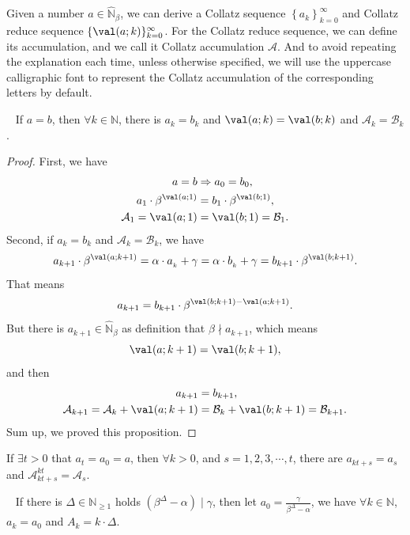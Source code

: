 Given a number $a \in \widehat{\mathbb{N}}_{{\beta}}$, we can derive a Collatz sequence $\left\{a_{k}\right\}_{k = 0}^{\infty}$ and Collatz reduce sequence $\{\val(a;k)\}_{k=0}^{\infty}$. For the Collatz reduce sequence, we can define its accumulation, and we call it Collatz accumulation $\mathcal{A}$.
And to avoid repeating the explanation each time, unless otherwise specified, we will use the uppercase calligraphic font to represent the Collatz accumulation of the corresponding letters by default.
\begin{proposition}[Uniqueness]~\label{proposition:uniqueness}
If $a = b$, then $\forall k \in \mathbb{N}$, there is $a_k = b_k$ and $\val(a;k) = \val(b;k)$ and $\mathcal{A}_k = \mathcal{B}_k$.
\end{proposition}
\begin{proof}
    First, we have
    \begin{align*}
        a = b &\Rightarrow a_0 = b_0, \\
        a_1 \cdot \beta^{\val(a;1)} &= b_1 \cdot \beta^{\val(b;1)}, \\
        \mathcal{A}_1 = \val(a;1) &= \val(b;1) = \mathcal{B}_1.
    \end{align*}
    Second, if $a_k = b_k$ and $\mathcal{A}_k = \mathcal{B}_k$, we have
    \[a_{k+1} \cdot \beta^{\val(a;k + 1)} = \alpha\cdot a_{_k} + \gamma = \alpha\cdot b_{_k} + \gamma = b_{k+1} \cdot \beta^{\val(b;k + 1)}.\]
    That means
    \[a_{k+1} = b_{k+1} \cdot \beta^{\val(b;k + 1) - \val(a;k + 1)}. \]
    But there is $a_{k+1} \in \widehat{\mathbb{N}}_{{\beta}}$ as definition that $\beta \nmid a_{k+1}$, which means
    \[\val(a;k + 1) = \val(b;k + 1), \]
    and then
    \begin{align*}
        a_{k+1} &= b_{k+1}, \\
        \mathcal{A}_{k+1} = \mathcal{A}_{k} + \val(a;k+1) &= \mathcal{B}_{k} + \val(b;k+1) = \mathcal{B}_{k+1}.
    \end{align*}
    Sum up, we proved this proposition.
\end{proof}
\begin{proposition}
    If $\exists t > 0$ that $a_{t} = a_0 = a$, 
    then $\forall k > 0$, and $s = 1, 2, 3, \cdots, t$, there are
    $a_{kt+s} = a_s$ and $\mathcal{A}_{kt + s}^{kt} = \mathcal{A}_{s}$.
\end{proposition}
\begin{proposition}~\label{proposition:trivial-periodic-sequence}
    If there is $\Delta \in \mathbb{N}_{\ge1}$ holds $(\beta^{\Delta} - \alpha) \mid \gamma$, then let $a_0 = \frac{\gamma}{\beta^{\Delta} - \alpha}$, we have $\forall k \in \mathbb{N}$, $a_k = a_0$ and $A_k = k\cdot \Delta$.
\end{proposition}
